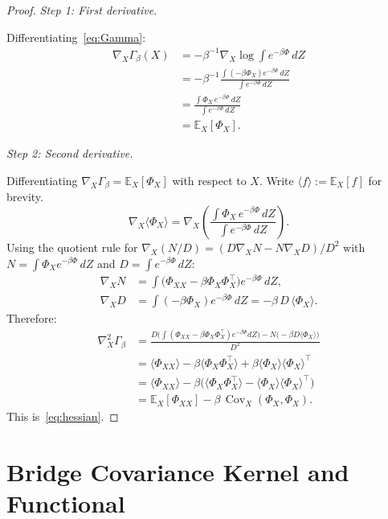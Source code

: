 \documentclass[12pt]{article}
\theoremstyle{plain}
\theoremstyle{definition}
\numberwithin{equation}{section}
\DeclareMathOperator{\Cov}{Cov}
\begin{document}
\begin{proof}
\emph{Step 1: First derivative.}

Differentiating~\eqref{eq:Gamma}:
\begin{align}
\nabla_X\Gamma_\beta(X)
&= -\beta^{-1}\nabla_X\log\int e^{-\beta\Phi}\,dZ\\
&= -\beta^{-1}\frac{\int(-\beta\Phi_X)e^{-\beta\Phi}\,dZ}
{\int e^{-\beta\Phi}\,dZ}\\
&= \frac{\int\Phi_X\,e^{-\beta\Phi}\,dZ}
{\int e^{-\beta\Phi}\,dZ}\\
&= \mathbb{E}_X[\Phi_X].
\end{align}

\emph{Step 2: Second derivative.}

Differentiating $\nabla_X\Gamma_\beta=\mathbb{E}_X[\Phi_X]$
with respect to $X$.  Write
$\langle f\rangle:=\mathbb{E}_X[f]$ for brevity.
\begin{equation}
\nabla_X\langle\Phi_X\rangle
= \nabla_X\!\left(\frac{\int\Phi_X\,e^{-\beta\Phi}\,dZ}
{\int e^{-\beta\Phi}\,dZ}\right).
\end{equation}
Using the quotient rule for $\nabla_X(N/D)=(D\nabla_X N-N\nabla_X D)/D^2$
with $N=\int\Phi_X e^{-\beta\Phi}\,dZ$ and $D=\int e^{-\beta\Phi}\,dZ$:
\begin{align}
\nabla_X N &= \int\bigl(\Phi_{XX}-\beta\Phi_X\Phi_X^\top\bigr)
e^{-\beta\Phi}\,dZ,\\
\nabla_X D &= \int(-\beta\Phi_X)e^{-\beta\Phi}\,dZ
= -\beta\,D\,\langle\Phi_X\rangle.
\end{align}
Therefore:
\begin{align}
\nabla_X^2\Gamma_\beta
&= \frac{D\bigl(\int(\Phi_{XX}-\beta\Phi_X\Phi_X^\top)
e^{-\beta\Phi}dZ\bigr)
-N\bigl(-\beta D\langle\Phi_X\rangle\bigr)}{D^2}\\
&= \langle\Phi_{XX}\rangle
-\beta\langle\Phi_X\Phi_X^\top\rangle
+\beta\langle\Phi_X\rangle\langle\Phi_X\rangle^\top\\
&= \langle\Phi_{XX}\rangle
-\beta\bigl(\langle\Phi_X\Phi_X^\top\rangle
-\langle\Phi_X\rangle\langle\Phi_X\rangle^\top\bigr)\\
&= \mathbb{E}_X[\Phi_{XX}]-\beta\,\Cov_X(\Phi_X,\Phi_X).
\end{align}
This is~\eqref{eq:hessian}.
\end{proof}


\section{Bridge Covariance Kernel and Functional}\label{sec:covariance}
\end{document}
